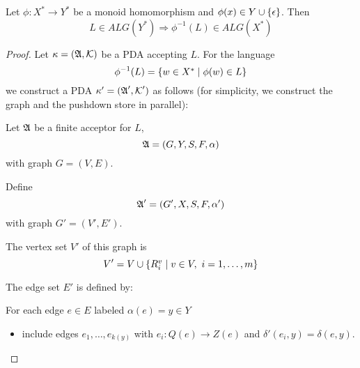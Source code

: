 \bigskip
\begin{theorem}
Let $\phi : X^* \to Y^*$ be a monoid homomorphism and $\phi(x) \in Y \cup
\mbox{$\{\epsilon\}$}$. Then
\[ L \in ALG(Y^*) \Rightarrow \phi^{-1}(L) \in ALG(X^*) \]
\end{theorem}

\begin{proof}
Let $\kappa = (\mbox{$\mathfrak{A}$}, \mbox{$\mathcal{K}$})$ be a PDA accepting $L$. For the language
\[ \phi^{-1}(L) = \mbox{$\{w \in X^* \mid \phi(w) \in L\}$} \]
we construct a PDA $\kappa' = (\mbox{$\mathfrak{A}$}', \mbox{$\mathcal{K}$}')$ as follows (for
simplicity, we construct the graph and the pushdown store in parallel):

Let $\mbox{$\mathfrak{A}$}$ be a finite acceptor for $L$,
\[ \mbox{$\mathfrak{A}$} = (G, Y, S, F, \alpha) \]
with graph $G = (V, E)$.

Define
\[ \mbox{$\mathfrak{A}$}' = (G', X, S, F, \alpha') \]
with graph $G' = (V', E')$.

The vertex set $V'$ of this graph is
\[ V' = V \cup \mbox{$\{R_i^{v} \mid v \in V,\ i = 1,\ldots,m\}$} \]

The edge set $E'$ is defined by:

For each edge $e \in E$ labeled $\alpha(e) = y \in Y$
\begin{itemize}
  \item include edges $e_1, \ldots, e_{k(y)}$ with $e_i : Q(e) \to Z(e)$ and
  $\delta'(e_i, y) = \delta(e, y)$.
\end{itemize}
\end{proof}































